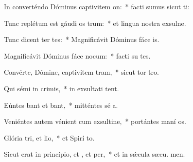 \item In converténdo Dóminus captivitem on:~* facti sumus sicut ti:
\item Tunc replétum est gáudi os trum:~* et lingua nostra exsulne.
\item Tunc dicent ter tes:~* Magnificávit Dóminus fáce  is.
\item Magnificávit Dóminus fáce nocum:~* facti su tes.
\item Convérte, Dómine, captivitem tram,~* sicut tor  tro.
\item Qui sémi in crimis,~* in exsultati tent.
\item Eúntes bant et bant,~* mitténtes sé a.
\item Veniéntes autem vénient cum exsultine,~* portántes maní os.
\item Glória tri, et lio,~* et Spirí to.
\item Sicut erat in princípio, et , et per,~* et in sǽcula sæcu. men.
